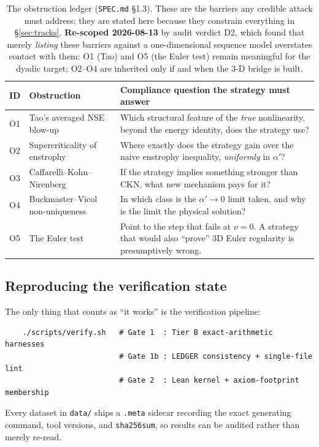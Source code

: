 \documentclass[11pt,a4paper]{article}
\theoremstyle{definition}
\theoremstyle{plain}
\begin{document}
\begin{table}[h]
\centering
\small
\begin{tabular}{@{}p{0.8cm}p{4.6cm}p{9.2cm}@{}}
\toprule
\textbf{ID} & \textbf{Obstruction} & \textbf{Compliance question the strategy must answer} \\
\midrule
O1 & Tao's averaged NSE blow-up & Which structural feature of the \emph{true} nonlinearity, beyond the energy identity, does the strategy use? \\
O2 & Supercriticality of enstrophy & Where exactly does the strategy gain over the naive enstrophy inequality, \emph{uniformly} in $\alpha'$? \\
O3 & Caffarelli--Kohn--Nirenberg & If the strategy implies something stronger than CKN, what new mechanism pays for it? \\
O4 & Buckmaster--Vicol non-uniqueness \cite{buckmaster-vicol} & In which class is the $\alpha'\to0$ limit taken, and why is the limit the physical solution? \\
O5 & The Euler test & Point to the step that fails at $\nu=0$. A strategy that would also ``prove'' 3D Euler regularity is presumptively wrong. \\
\bottomrule
\end{tabular}
\caption{The obstruction ledger (\texttt{SPEC.md} \S1.3). These are the barriers any credible
attack must address; they are stated here because they constrain everything in
\S\ref{sec:tracks}. \textbf{Re-scoped 2026-08-13} by audit verdict D2, which found that
merely \emph{listing} these barriers against a one-dimensional sequence model overstates
contact with them: O1 (Tao) and O5 (the Euler test) remain meaningful for the dyadic target;
O2--O4 are inherited only if and when the 3-D bridge is built.}
\label{tab:obstructions}
\end{table}

\subsection{Reproducing the verification state}

The only thing that counts as ``it works'' is the verification pipeline:
\begin{verbatim}
    ./scripts/verify.sh   # Gate 1  : Tier B exact-arithmetic harnesses
                          # Gate 1b : LEDGER consistency + single-file lint
                          # Gate 2  : Lean kernel + axiom-footprint membership
\end{verbatim}
Every dataset in \texttt{data/} ships a \texttt{.meta} sidecar recording the exact generating
command, tool versions, and \texttt{sha256sum}, so results can be audited rather than merely
re-read.
\end{document}
